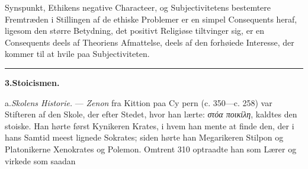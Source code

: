 \documentclass[12pt,a4paper]{book}
\newcommand{\divrule}{\begin{center}\rule{2cm}{0.4pt}\end{center}}
\newcommand{\gk}[1]{\textit{#1}}
\begin{document}
Synspunkt, Ethikens negative Characteer, og Subjectivitetens
bestemtere Fremtræden i Stillingen af de ethiske Problemer
er en simpel Consequents heraf, ligesom den større Betydning,
det positivt Religiøse tiltvinger sig, er en Consequents deels
af Theoriens Afmattelse, deels af den forhøiede Interesse, der
kommer til at hvile paa Subjectiviteten.
\divrule
\begin{center}
\textbf{3.\enspace Stoicismen.}
\end{center}
a.\enspace \emph{Skolens Historie.} --- \emph{Zenon} fra Kittion paa Cy\-%
pern (c. 350---c. 258) var Stifteren af den Skole, der efter
Stedet, hvor han lærte: \gk{στόα ποικίλη}, kaldtes den stoiske. Han
hørte først Kynikeren Krates, i hvem han mente at finde den,
der i hans Samtid meest lignede Sokrates; siden hørte han
Megarikeren Stilpon og Platonikerne Xenokrates og Polemon.
Omtrent 310 optraadte han som Lærer og virkede som saadan
\end{document}
